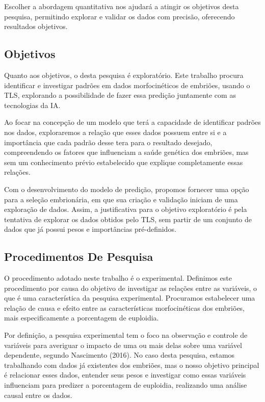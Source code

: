 Escolher a abordagem quantitativa nos ajudará a atingir os objetivos desta pesquisa, permitindo explorar e validar os dados com precisão, oferecendo resultados objetivos. 

\subsection{Objetivos}

Quanto aos objetivos, o desta pesquisa é exploratório. Este trabalho procura identificar e investigar padrões em dados morfocinéticos de embriões, usando o TLS, explorando a possibilidade de fazer essa predição juntamente com as tecnologias da IA. 

Ao focar na concepção de um modelo que terá a capacidade de identificar padrões nos dados, exploraremos a relação que esses dados possuem entre si e a importância que cada padrão desse tera para o resultado desejado, compreendendo os fatores que influenciam a saúde genética dos embriões, mas sem um conhecimento prévio estabelecido que explique completamente essas relações.

Com o desenvolvimento do modelo de predição, propomos fornecer uma opção para a seleção embrionária, em que sua criação e validação iniciam de uma exploração de dados. Assim, a justificativa para o objetivo exploratório é pela tentativa de explorar os dados obtidos pelo TLS, sem partir de um conjunto de dados que já possui pesos e importâncias pré-definidos. 

\subsection{Procedimentos De Pesquisa}

O procedimento adotado neste trabalho é o experimental. Definimos este procedimento por causa do objetivo de investigar as relações entre as variáveis, o que é uma característica da pesquisa experimental. Procuramos estabelecer uma relação de causa e efeito entre as características morfocinéticas dos embriões, mais especificamente a porcentagem de euploidia.

Por definição, a pesquisa experimental tem o foco na observação e controle de variáveis para averiguar o impacto de uma ou mais delas sobre uma variável dependente, segundo Nascimento (2016). No caso desta pesquisa, estamos trabalhando com dados já existentes dos embriões, mas o nosso objetivo principal é relacionar esses dados, entender seus pesos e investigar como essas variáveis influenciam para predizer a porcentagem de euploidia, realizando uma análise causal entre os dados. 

